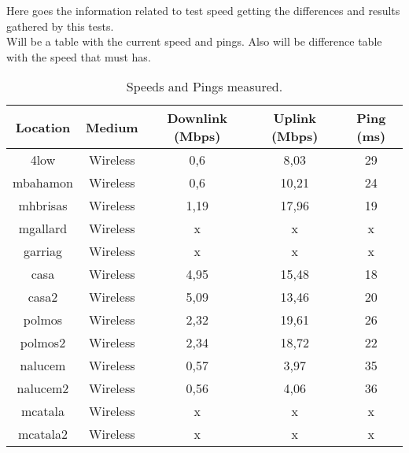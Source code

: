 Here goes the information related to test speed getting the differences and results gathered by this tests.\\

Will be a table with the current speed and pings. Also will be difference table with the speed that must has.\\

\begin{table}[h]
\caption[Speed Test: Speeds and Ping measured]{Speeds and Pings measured. }
\begin{center}
\begin{tabular}{|c||c|c|c|c|}
\hline
Location  & Medium  & Downlink (Mbps) & Uplink (Mbps) & Ping (ms)\\ \hline\hline
 4low     & Wireless & 0,6            & 8,03          & 29 \\ \hline       %
 mbahamon & Wireless & 0,6            & 10,21         & 24 \\ \hline       %
 mhbrisas & Wireless & 1,19           & 17,96         & 19 \\ \hline       %
 mgallard & Wireless & x              & x             & x \\ \hline        %
 garriag  & Wireless & x              & x             & x \\ \hline        %
 casa     & Wireless & 4,95           & 15,48         & 18 \\ \hline       %
 casa2    & Wireless & 5,09           & 13,46         & 20 \\ \hline       %
 polmos   & Wireless & 2,32           & 19,61         & 26 \\ \hline       %
 polmos2  & Wireless & 2,34           & 18,72         & 22 \\ \hline       %
 nalucem  & Wireless & 0,57           & 3,97          & 35 \\ \hline       %
 nalucem2 & Wireless & 0,56           & 4,06          & 36 \\ \hline       %
 mcatala  & Wireless & x              & x 			  & x \\ \hline        %
 mcatala2 & Wireless & x              & x 			  & x \\ \hline        %
\end{tabular}
\end{center}
\label{table:speeds}
\end{table}


